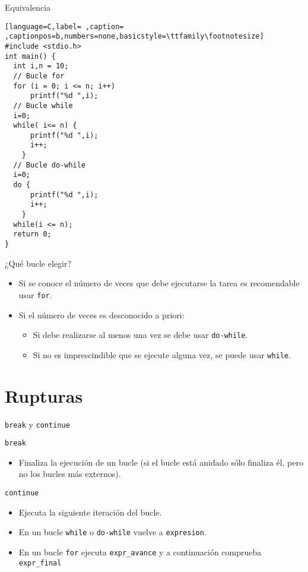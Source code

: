 \documentclass[usenames,svgnames,dvipsnames, aspectratio=169]{beamer}
\begin{document}
\begin{frame}[label={sec:org8ed4561},fragile,plain]{Equivalencia}
 \begin{lstlisting}[language=C,label= ,caption= ,captionpos=b,numbers=none,basicstyle=\ttfamily\footnotesize]
#include <stdio.h>
int main() {
  int i,n = 10;
  // Bucle for
  for (i = 0; i <= n; i++)
      printf("%d ",i);
  // Bucle while
  i=0;
  while( i<= n) {
      printf("%d ",i);
      i++;
    }
  // Bucle do-while
  i=0;
  do {
      printf("%d ",i);
      i++;
    }
  while(i <= n);
  return 0;
}
\end{lstlisting}
\end{frame}
\begin{frame}[label={sec:orgfe86a0d},fragile]{¿Qué bucle elegir?}
 \begin{itemize}
\item Si se conoce el número de veces que debe ejecutarse la tarea es recomendable usar \texttt{for}.
\item Si el número de veces es desconocido a priori:
\begin{itemize}
\item Si debe realizarse al menos una vez se debe usar \texttt{do-while}.
\item Si no es imprescindible que se ejecute alguna vez, se puede usar \texttt{while}.
\end{itemize}
\end{itemize}
\end{frame}
\section{Rupturas}
\label{sec:org61cfebb}
\begin{frame}[label={sec:orgd4afbfc},fragile]{\texttt{break} y \texttt{continue}}
 \begin{block}{\texttt{break}}
\begin{itemize}
\item Finaliza la ejecución de un bucle (si el bucle está anidado sólo finaliza él, pero no los bucles más externos).
\end{itemize}
\end{block}

\begin{block}{\texttt{continue}}
\begin{itemize}
\item Ejecuta la siguiente iteración del bucle.
\item En un bucle \texttt{while} o \texttt{do-while} vuelve a \texttt{expresion}.
\item En un bucle \texttt{for} ejecuta \texttt{expr\_avance} y a continuación comprueba \texttt{expr\_final}
\end{itemize}
\end{block}
\end{frame}
\end{document}
